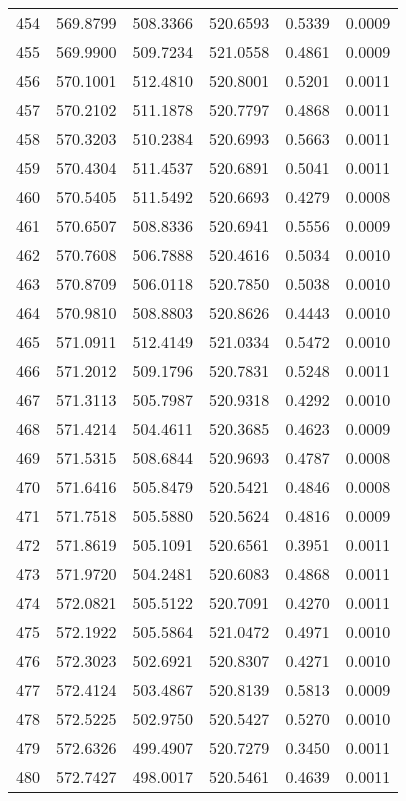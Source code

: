 \documentclass{article}
\begin{document}
\begin{longtable}{|c|c|c|c|c|c|}
454 & 569.8799 & 508.3366 & 520.6593 & 0.5339 & 0.0009 \\
455 & 569.9900 & 509.7234 & 521.0558 & 0.4861 & 0.0009 \\
456 & 570.1001 & 512.4810 & 520.8001 & 0.5201 & 0.0011 \\
457 & 570.2102 & 511.1878 & 520.7797 & 0.4868 & 0.0011 \\
458 & 570.3203 & 510.2384 & 520.6993 & 0.5663 & 0.0011 \\
459 & 570.4304 & 511.4537 & 520.6891 & 0.5041 & 0.0011 \\
460 & 570.5405 & 511.5492 & 520.6693 & 0.4279 & 0.0008 \\
461 & 570.6507 & 508.8336 & 520.6941 & 0.5556 & 0.0009 \\
462 & 570.7608 & 506.7888 & 520.4616 & 0.5034 & 0.0010 \\
463 & 570.8709 & 506.0118 & 520.7850 & 0.5038 & 0.0010 \\
464 & 570.9810 & 508.8803 & 520.8626 & 0.4443 & 0.0010 \\
465 & 571.0911 & 512.4149 & 521.0334 & 0.5472 & 0.0010 \\
466 & 571.2012 & 509.1796 & 520.7831 & 0.5248 & 0.0011 \\
467 & 571.3113 & 505.7987 & 520.9318 & 0.4292 & 0.0010 \\
468 & 571.4214 & 504.4611 & 520.3685 & 0.4623 & 0.0009 \\
469 & 571.5315 & 508.6844 & 520.9693 & 0.4787 & 0.0008 \\
470 & 571.6416 & 505.8479 & 520.5421 & 0.4846 & 0.0008 \\
471 & 571.7518 & 505.5880 & 520.5624 & 0.4816 & 0.0009 \\
472 & 571.8619 & 505.1091 & 520.6561 & 0.3951 & 0.0011 \\
473 & 571.9720 & 504.2481 & 520.6083 & 0.4868 & 0.0011 \\
474 & 572.0821 & 505.5122 & 520.7091 & 0.4270 & 0.0011 \\
475 & 572.1922 & 505.5864 & 521.0472 & 0.4971 & 0.0010 \\
476 & 572.3023 & 502.6921 & 520.8307 & 0.4271 & 0.0010 \\
477 & 572.4124 & 503.4867 & 520.8139 & 0.5813 & 0.0009 \\
478 & 572.5225 & 502.9750 & 520.5427 & 0.5270 & 0.0010 \\
479 & 572.6326 & 499.4907 & 520.7279 & 0.3450 & 0.0011 \\
480 & 572.7427 & 498.0017 & 520.5461 & 0.4639 & 0.0011 \\

\end{longtable}
\end{document}
